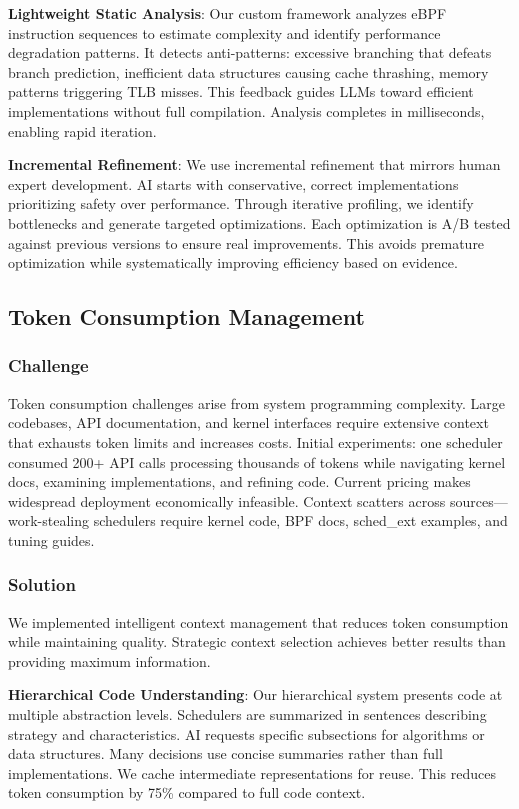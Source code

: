 \textbf{Lightweight Static Analysis}: Our custom framework analyzes eBPF instruction sequences to estimate complexity and identify performance degradation patterns. It detects anti-patterns: excessive branching that defeats branch prediction, inefficient data structures causing cache thrashing, memory patterns triggering TLB misses. This feedback guides LLMs toward efficient implementations without full compilation. Analysis completes in milliseconds, enabling rapid iteration.

\textbf{Incremental Refinement}: We use incremental refinement that mirrors human expert development. AI starts with conservative, correct implementations prioritizing safety over performance. Through iterative profiling, we identify bottlenecks and generate targeted optimizations. Each optimization is A/B tested against previous versions to ensure real improvements. This avoids premature optimization while systematically improving efficiency based on evidence.

\subsection{Token Consumption Management}

\subsubsection{Challenge}
Token consumption challenges arise from system programming complexity. Large codebases, API documentation, and kernel interfaces require extensive context that exhausts token limits and increases costs. Initial experiments: one scheduler consumed 200+ API calls processing thousands of tokens while navigating kernel docs, examining implementations, and refining code. Current pricing makes widespread deployment economically infeasible. Context scatters across sources—work-stealing schedulers require kernel code, BPF docs, sched\_ext examples, and tuning guides.

\subsubsection{Solution}
We implemented intelligent context management that reduces token consumption while maintaining quality. Strategic context selection achieves better results than providing maximum information.

\textbf{Hierarchical Code Understanding}: Our hierarchical system presents code at multiple abstraction levels. Schedulers are summarized in sentences describing strategy and characteristics. AI requests specific subsections for algorithms or data structures. Many decisions use concise summaries rather than full implementations. We cache intermediate representations for reuse. This reduces token consumption by 75\% compared to full code context.

